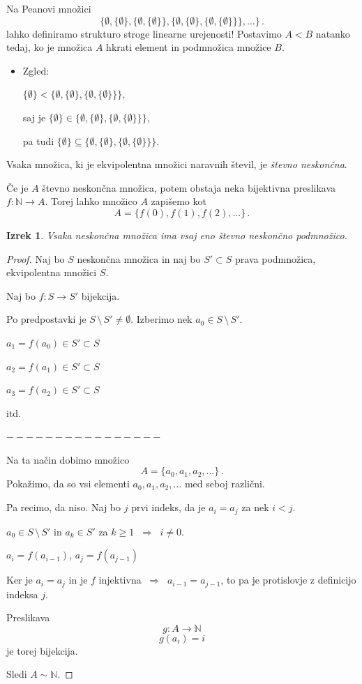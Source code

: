 \documentclass[11pt,paper=b5,footinclude,headinclude]{scrbook} %
\def\sledi {{~\Rightarrow~}}
\def\brez {{\,\setminus\,}}
\newtheorem*{izrek}{Izrek}
\begin{document}
\bigskip
Na Peanovi množici
 $$\{\emptyset, \{\emptyset\}, \{\emptyset, \{\emptyset\}\}, \{\emptyset, \{\emptyset\}, \{\emptyset, \{\emptyset\}\}\}, \ldots\}\,.$$
lahko definiramo strukturo stroge linearne urejenosti! Postavimo
$A<B$ natanko tedaj, ko je množica $A$ hkrati element in podmnožica množice $B$.
\begin{itemize}
  \item Zgled:

  $\{\emptyset\} < \{\emptyset, \{\emptyset\}, \{\emptyset, \{\emptyset\}\}\}$,

      saj je $\{\emptyset\} \in \{\emptyset, \{\emptyset\}, \{\emptyset, \{\emptyset\}\}\}$,

      pa tudi $\{\emptyset\} \subseteq  \{\emptyset, \{\emptyset\}, \{\emptyset, \{\emptyset\}\}\}$.
\end{itemize}

\bigskip

Vsaka množica, ki je ekvipolentna množici naravnih števil, je {\em števno neskončna}.

Če je $A$ števno neskončna množica, potem obstaja neka bijektivna preslikava $f:\mathbb{N}\to A$.
Torej lahko množico $A$ zapišemo kot
$$A = \{f(0), f(1), f(2),\ldots\}\,.$$

\begin{izrek}
Vsaka neskončna množica ima vsaj eno števno neskončno podmnožico.
\end{izrek}

\begin{proof}
Naj bo $S$ neskončna množica in naj bo $S'\subset S$ prava podmnožica, ekvipolentna množici $S$.

Naj bo $f:S\to S'$ bijekcija.

Po predpostavki je $S\brez S'\neq \emptyset$. Izberimo nek $a_0\in S\brez S'$.

$a_1 = f(a_0)\in S'\subset S$

$a_2 = f(a_1)\in S'\subset S$

$a_3 = f(a_2)\in S'\subset S$

itd.

$----------------$

Na ta način dobimo množico
$$A = \{a_0,a_1,a_2,\ldots\}\,.$$
Pokažimo, da so vsi elementi $a_0,a_1,a_2,\ldots$ med seboj različni.

Pa recimo, da niso. Naj bo $j$ prvi indeks, da je $a_i = a_j$ za nek $i<j$.

$a_0\in S\brez S'$ in $a_k\in S'$ za $k\ge 1$ $\sledi$ $i\neq 0$.

$a_i = f(a_{i-1})$, $a_j = f(a_{j-1})$

Ker je $a_i = a_j$ in je $f$ injektivna $\sledi$ $a_{i-1} = a_{j-1}$, to pa je protislovje z definicijo indeksa $j$.

Preslikava
$$g:A\to \mathbb{N}$$
$$g(a_i) = i$$
je torej bijekcija.

Sledi $A\sim \mathbb{N}$.
\end{proof}
\end{document}
